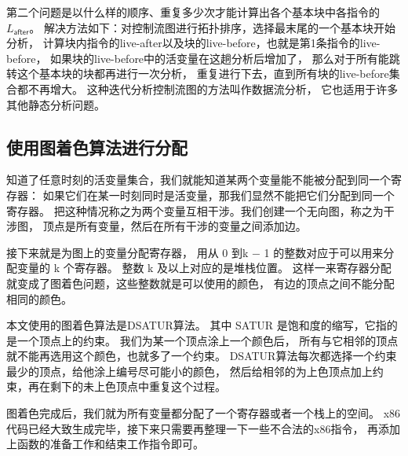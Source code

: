 第二个问题是以什么样的顺序、重复多少次才能计算出各个基本块中各指令的$L_{\mathsf{after}}$。
解决方法如下：对控制流图进行拓扑排序，选择最末尾的一个基本块开始分析，
计算块内指令的live-after以及块的live-before，也就是第1条指令的live-before，
如果块的live-before中的活变量在这趟分析后增加了，
那么对于所有能跳转这个基本块的块都再进行一次分析，
重复进行下去，直到所有块的live-before集合都不再增大。
这种迭代分析控制流图的方法叫作数据流分析\cite{Kildall_1973}，
它也适用于许多其他静态分析问题。
\begin{comment}
下面的代码描述了这一迭代过程。其中\code{trans-G}是转置后的控制流图，
用以计算哪些基本块指向了某一个块，
\code{label->live}是一个字典，用于记录每个基本块的live-before集合。

\begin{lstlisting}
(while (not (queue-empty? worklist))
  (define label (dequeue! worklist))
  (define-values (new-block new-live-before)
    (uncover-live-block (dict-ref blocks label) label->live))
  (hash-set! new-blocks label new-block)
  (unless (equal? new-live-before (hash-ref label->live label))
    (hash-set! label->live label new-live-before)
    (for ([label^ (in-neighbors trans-G label)])
      (enqueue! worklist label^))))
\end{lstlisting}
\end{comment}


\subsection{使用图着色算法进行分配}

知道了任意时刻的活变量集合，我们就能知道某两个变量能不能被分配到同一个寄存器：
如果它们在某一时刻同时是活变量，那我们显然不能把它们分配到同一个寄存器。
把这种情况称之为两个变量互相干涉。我们创建一个无向图，称之为干涉图，
顶点是所有变量，然后在所有干涉的变量之间添加边。

接下来就是为图上的变量分配寄存器，
用从 0 到k − 1 的整数对应于可以用来分配变量的 k 个寄存器。
整数 k 及以上对应的是堆栈位置。
这样一来寄存器分配就变成了图着色问题，这些整数就是可以使用的颜色，
有边的顶点之间不能分配相同的颜色。

本文使用的图着色算法是DSATUR算法\cite{Brélaz_1979}。
其中 SATUR 是饱和度的缩写，它指的是一个顶点上的约束。
我们为某一个顶点涂上一个颜色后，
所有与它相邻的顶点就不能再选用这个颜色，也就多了一个约束。
DSATUR算法每次都选择一个约束最少的顶点，给他涂上编号尽可能小的颜色，
然后给相邻的为上色顶点加上约束，再在剩下的未上色顶点中重复这个过程。

图着色完成后，我们就为所有变量都分配了一个寄存器或者一个栈上的空间。
x86代码已经大致生成完毕，接下来只需要再整理一下一些不合法的x86指令，
再添加上函数的准备工作和结束工作指令即可。
